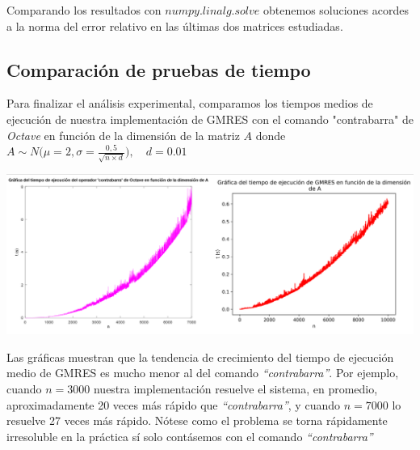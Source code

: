 \documentclass{endm}
\begin{document}
Comparando los resultados con $numpy.linalg.solve$ obtenemos soluciones acordes a la norma del error relativo en las últimas dos matrices estudiadas.\\

\subsection{Comparaci\'on de pruebas de tiempo}

Para finalizar el análisis experimental, comparamos los tiempos medios de ejecución de nuestra implementación de GMRES con el comando "contrabarra" de \textit{Octave} en función de la dimensión de la matriz $A$ donde $A \sim N \Bigg(\mu=2,\sigma=\frac{0,5}{\sqrt{n \times d}} \Bigg), \quad d =0.01$

\begin{center}
    \includegraphics[scale=0.6]{snip.PNG}\\
\end{center}
Las gráficas muestran que la tendencia de crecimiento del tiempo de ejecución medio de GMRES es mucho menor al del comando \textit{“contrabarra”}. Por ejemplo, cuando $n=3000$ nuestra implementación resuelve el sistema, en promedio, aproximadamente 20 veces más rápido que \textit{“contrabarra”}, y cuando $n=7000$ lo resuelve 27 veces más rápido. Nótese como el problema se torna rápidamente irresoluble en la práctica sí solo contásemos con el comando \textit{“contrabarra”}
\end{document}
